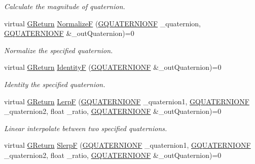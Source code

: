\begin{DoxyCompactItemize}
\begin{DoxyCompactList}\small\item\em Calculate the magnitude of quaternion. \end{DoxyCompactList}\item 
virtual \mbox{\hyperlink{namespace_g_w_a67a839e3df7ea8a5c5686613a7a3de21}{G\+Return}} \mbox{\hyperlink{class_g_w_1_1_m_a_t_h_1_1_g_quaternion_ac1f96d734beba721fdfbc2e5cfb72cd2}{NormalizeF}} (\mbox{\hyperlink{struct_g_w_1_1_m_a_t_h_1_1_g_q_u_a_t_e_r_n_i_o_n_f}{G\+Q\+U\+A\+T\+E\+R\+N\+I\+O\+NF}} \+\_\+quaternion, \mbox{\hyperlink{struct_g_w_1_1_m_a_t_h_1_1_g_q_u_a_t_e_r_n_i_o_n_f}{G\+Q\+U\+A\+T\+E\+R\+N\+I\+O\+NF}} \&\+\_\+out\+Quaternion)=0
\begin{DoxyCompactList}\small\item\em Normalize the specified quaternion. \end{DoxyCompactList}\item 
virtual \mbox{\hyperlink{namespace_g_w_a67a839e3df7ea8a5c5686613a7a3de21}{G\+Return}} \mbox{\hyperlink{class_g_w_1_1_m_a_t_h_1_1_g_quaternion_a4aac4b3d58d3f7ceb2c53c6651ccd15e}{IdentityF}} (\mbox{\hyperlink{struct_g_w_1_1_m_a_t_h_1_1_g_q_u_a_t_e_r_n_i_o_n_f}{G\+Q\+U\+A\+T\+E\+R\+N\+I\+O\+NF}} \&\+\_\+out\+Quaternion)=0
\begin{DoxyCompactList}\small\item\em Identity the specified quaternion. \end{DoxyCompactList}\item 
virtual \mbox{\hyperlink{namespace_g_w_a67a839e3df7ea8a5c5686613a7a3de21}{G\+Return}} \mbox{\hyperlink{class_g_w_1_1_m_a_t_h_1_1_g_quaternion_a1de2282e65771089996872bc7e90ade0}{LerpF}} (\mbox{\hyperlink{struct_g_w_1_1_m_a_t_h_1_1_g_q_u_a_t_e_r_n_i_o_n_f}{G\+Q\+U\+A\+T\+E\+R\+N\+I\+O\+NF}} \+\_\+quaternion1, \mbox{\hyperlink{struct_g_w_1_1_m_a_t_h_1_1_g_q_u_a_t_e_r_n_i_o_n_f}{G\+Q\+U\+A\+T\+E\+R\+N\+I\+O\+NF}} \+\_\+quaternion2, float \+\_\+ratio, \mbox{\hyperlink{struct_g_w_1_1_m_a_t_h_1_1_g_q_u_a_t_e_r_n_i_o_n_f}{G\+Q\+U\+A\+T\+E\+R\+N\+I\+O\+NF}} \&\+\_\+out\+Quaternion)=0
\begin{DoxyCompactList}\small\item\em Linear interpolate between two specified quaternions. \end{DoxyCompactList}\item 
virtual \mbox{\hyperlink{namespace_g_w_a67a839e3df7ea8a5c5686613a7a3de21}{G\+Return}} \mbox{\hyperlink{class_g_w_1_1_m_a_t_h_1_1_g_quaternion_a1dc2330222c0a78796629503847a67c7}{SlerpF}} (\mbox{\hyperlink{struct_g_w_1_1_m_a_t_h_1_1_g_q_u_a_t_e_r_n_i_o_n_f}{G\+Q\+U\+A\+T\+E\+R\+N\+I\+O\+NF}} \+\_\+quaternion1, \mbox{\hyperlink{struct_g_w_1_1_m_a_t_h_1_1_g_q_u_a_t_e_r_n_i_o_n_f}{G\+Q\+U\+A\+T\+E\+R\+N\+I\+O\+NF}} \+\_\+quaternion2, float \+\_\+ratio, \mbox{\hyperlink{struct_g_w_1_1_m_a_t_h_1_1_g_q_u_a_t_e_r_n_i_o_n_f}{G\+Q\+U\+A\+T\+E\+R\+N\+I\+O\+NF}} \&\+\_\+out\+Quaternion)=0

\end{DoxyCompactItemize}

